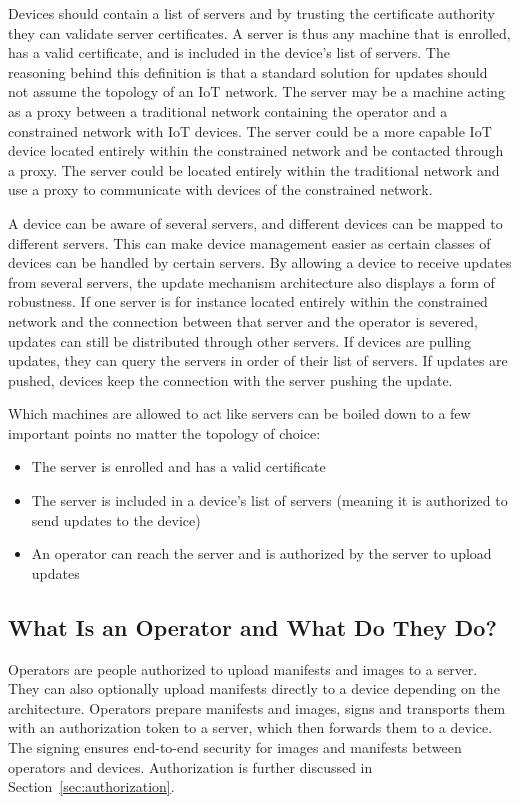 \documentclass[0-thesis.tex]{subfiles}
\begin{document}
Devices should contain a list of servers and by trusting the certificate authority they
can validate server certificates. A server is thus any machine that is enrolled, has a
valid certificate, and is included in the device's list of servers. The reasoning behind
this definition is that a standard solution for updates should not assume the topology of
an IoT network. The server may be a machine acting as a proxy between a traditional
network containing the operator and a constrained network with IoT devices. The server
could be a more capable IoT device located entirely within the constrained network and be
contacted through a proxy. The server could be located entirely within the traditional
network and use a proxy to communicate with devices of the constrained network.

A device can be aware of several servers, and different devices can be mapped to different
servers. This can make device management easier as certain classes of devices can be
handled by certain servers. By allowing a device to receive updates from several servers,
the update mechanism architecture also displays a form of robustness. If one server is for
instance located entirely within the constrained network and the connection between that
server and the operator is severed, updates can still be distributed through other
servers. If devices are pulling updates, they can query the servers in order of their list
of servers. If updates are pushed, devices keep the connection with the server pushing the
update.

Which machines are allowed to act like servers can be boiled down to a few important
points no matter the topology of choice:

\begin{itemize}
    \item The server is enrolled and has a valid certificate
    \item The server is included in a device's list of servers (meaning it is authorized to
            send updates to the device)
    \item An operator can reach the server and is authorized by the server to upload
            updates
\end{itemize}

\subsection{What Is an Operator and What Do They Do?}
\label{ssec:what-is-an-operator}
Operators are people authorized to upload manifests and images to a server. They can also
optionally upload manifests directly to a device depending on the architecture. Operators
prepare manifests and images, signs and transports them with an authorization token to a
server, which then forwards them to a device. The signing ensures end-to-end security for
images and manifests between operators and devices. Authorization is further discussed in
Section~\ref{sec:authorization}.
\end{document}
